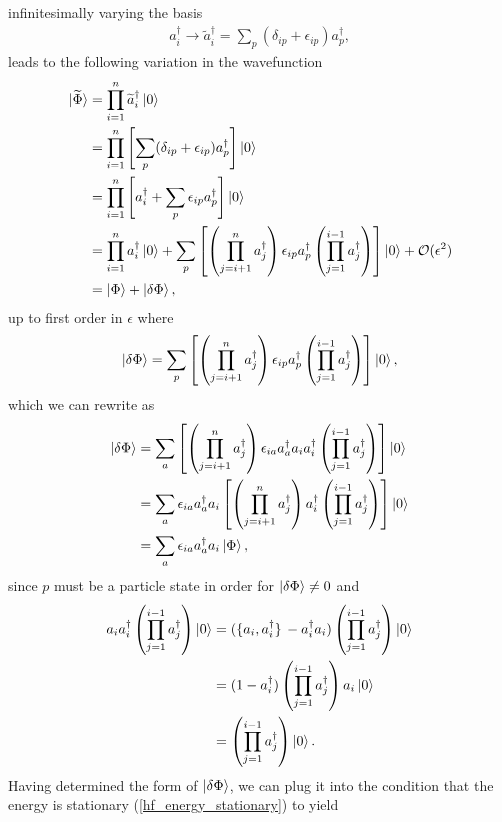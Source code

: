 \documentclass[10pt]{article}
\begin{document}
infinitesimally varying the basis
\begin{align}
a^\dagger_i
\to
\widetilde{a}^\dagger_i
=
\sum_p(\delta_{ip}+\epsilon_{ip})a^\dagger_p,
\end{align}
leads to the following variation in the wavefunction
\begin{align}
\ket*{\widetilde{\Phi}}
&=
\prod_{i=1}^n\widetilde{a}^\dagger_i\ket{0}
\\
&=
\prod_{i=1}^n\left[\sum_p(\delta_{ip}+\epsilon_{ip})a^\dagger_p\right]\ket{0}
\\
&=
\prod_{i=1}^n\left[a^\dagger_i+\sum_p\epsilon_{ip}a^\dagger_p\right]\ket{0}
\\
&=
\prod_{i=1}^na^\dagger_i\ket{0}
+
\sum_p\left[\left(\prod_{j=i+1}^na^\dagger_j\right)\epsilon_{ip}a^\dagger_p\left(\prod_{j=1}^{i-1}a^\dagger_j\right)\right]\ket{0}
+
\mathcal{O}(\epsilon^2)
\\
&=
\ket{\Phi}+\ket{\delta{\Phi}},
\end{align}
up to first order in $\epsilon$ where
\begin{align}
\ket{\delta\Phi}
=
\sum_p\left[\left(\prod_{j=i+1}^na^\dagger_j\right)\epsilon_{ip}a^\dagger_p\left(\prod_{j=1}^{i-1}a^\dagger_j\right)\right]\ket{0},
\end{align}
which we can rewrite as
\begin{align}
\ket{\delta\Phi}
&=
\sum_a\left[\left(\prod_{j=i+1}^na^\dagger_j\right)\epsilon_{ia}a^\dagger_aa_ia^\dagger_i\left(\prod_{j=1}^{i-1}a^\dagger_j\right)\right]\ket{0}
\\
&=
\sum_a\epsilon_{ia}a^\dagger_aa_i\left[\left(\prod_{j=i+1}^na^\dagger_j\right)a^\dagger_i\left(\prod_{j=1}^{i-1}a^\dagger_j\right)\right]\ket{0}
\\
&=
\sum_a\epsilon_{ia}a^\dagger_aa_i\ket{\Phi},
\end{align}
since $p$ must be a particle state in order for $\ket{\delta{\Phi}}\neq0$ and
\begin{align}
a_ia^\dagger_i\left(\prod_{j=1}^{i-1}a^\dagger_j\right)\ket{0}
&=
(\acomm*{a_i}{a^\dagger_i}-a^\dagger_ia_i)\left(\prod_{j=1}^{i-1}a^\dagger_j\right)\ket{0}
\nonumber
\\
&=
(1-a^\dagger_i)\left(\prod_{j=1}^{i-1}a^\dagger_j\right)a_i\ket{0}
\nonumber
\\
&=
\left(\prod_{j=1}^{i-1}a^\dagger_j\right)\ket{0}.
\end{align}
Having determined the form of $\ket{\delta{\Phi}}$, we can plug it into the condition that the energy is stationary (\ref{hf_energy_stationary}) to yield
\end{document}

